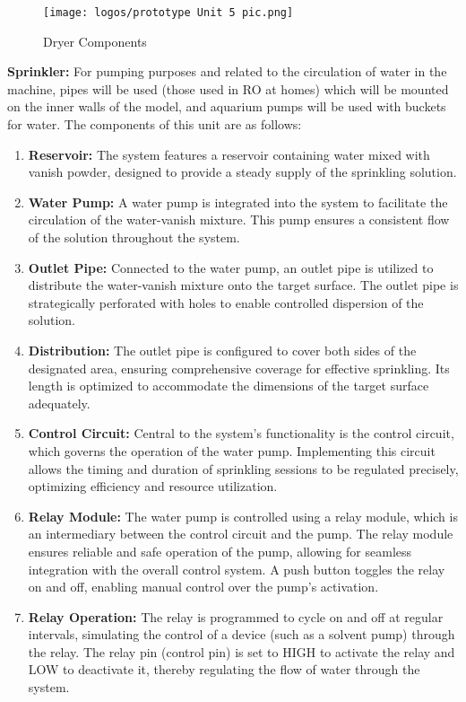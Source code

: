 \documentclass[table,french,english]{rapportCS}
\begin{document}
\begin{figure}[h]
    \centering
    \texttt{[image: logos/prototype Unit 5 pic.png]}
    \caption{Dryer Components}
    \label{fig:enter-label}
\end{figure}
\newpage
\vspace{0.8cm}
\textbf{Sprinkler:} For pumping purposes and related to the circulation of water in the machine, pipes will be used (those used in RO at homes) which will be mounted on the inner walls of the model, and aquarium pumps will be used with buckets for water. The components of this unit are as follows:
\begin{enumerate}[label=\arabic*.]
\item \textbf{Reservoir:} The system features a reservoir containing water mixed with vanish powder, designed to provide a steady supply of the sprinkling solution.
\item \textbf{Water Pump:} A water pump is integrated into the system to facilitate the circulation of the water-vanish mixture. This pump ensures a consistent flow of the solution throughout the system.
\item \textbf{Outlet Pipe:} Connected to the water pump, an outlet pipe is utilized to distribute the water-vanish mixture onto the target surface. The outlet pipe is strategically perforated with holes to enable controlled dispersion of the solution.
\item \textbf{Distribution:} The outlet pipe is configured to cover both sides of the designated area, ensuring comprehensive coverage for effective sprinkling. Its length is optimized to accommodate the dimensions of the target surface adequately.
\item \textbf{Control Circuit:} Central to the system's functionality is the control circuit, which governs the operation of the water pump. Implementing this circuit allows the timing and duration of sprinkling sessions to be regulated precisely, optimizing efficiency and resource utilization.
\item \textbf{Relay Module:} The water pump is controlled using a relay module, which is an intermediary between the control circuit and the pump. The relay module ensures reliable and safe operation of the pump, allowing for seamless integration with the overall control system. A push button toggles the relay on and off, enabling manual control over the pump's activation.
\item \textbf{Relay Operation:} The relay is programmed to cycle on and off at regular intervals, simulating the control of a device (such as a solvent pump) through the relay. The relay pin (control pin) is set to HIGH to activate the relay and LOW to deactivate it, thereby regulating the flow of water through the system.
\end{enumerate}
\end{document}
